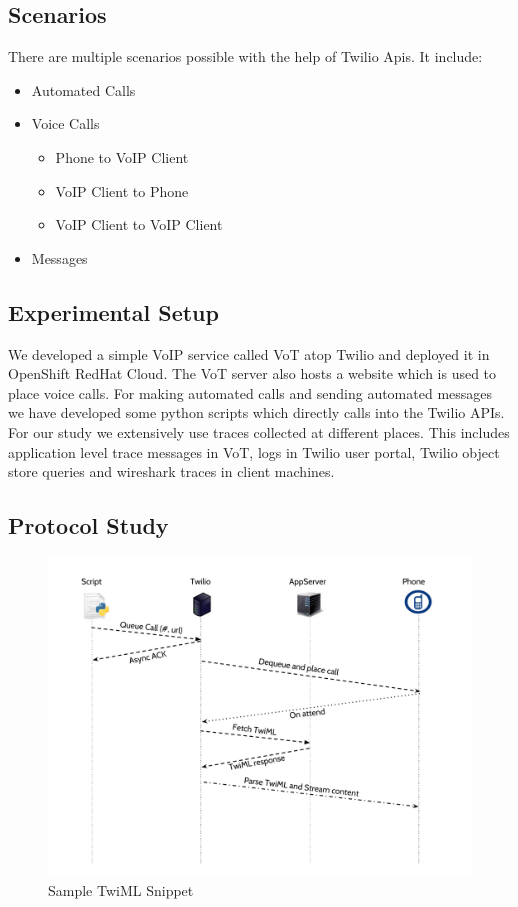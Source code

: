 \subsection{Scenarios}

There are multiple scenarios possible with the help of Twilio Apis. It include:

\begin{itemize}
\item Automated Calls
\item Voice Calls
\begin{itemize}
\item Phone to VoIP Client
\item VoIP Client to Phone
\item VoIP Client to VoIP Client
\end{itemize}
\item Messages
\end{itemize}

\subsection{Experimental Setup}

We developed a simple VoIP service called VoT atop Twilio and deployed it in OpenShift RedHat Cloud. The VoT server also hosts a website which is used to place voice calls. For making automated calls and sending automated messages we have developed some python scripts which directly calls into the Twilio APIs. For our study we extensively use traces collected at different places. This includes application level trace messages in VoT, logs in Twilio user portal, Twilio object store queries and wireshark traces in client machines.

\subsection{Protocol Study}

\begin{figure}[t!] 
\centering
  \includegraphics[width=\textwidth]{figs/auto.pdf}
\caption{Sample TwiML Snippet}
\label{fig:TwilML}
\end{figure} 
